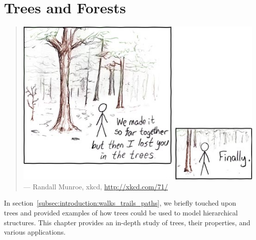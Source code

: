 
\chapter{Trees and Forests}
\label{chap:trees_forests}

\begin{quote}
\includegraphics[scale=3]{image/trees-forests/in-the-trees.png} \\
\noindent
--- Randall Munroe, xkcd,
\url{http://xkcd.com/71/}
\end{quote}

\noindent
In section~\ref{subsec:introduction:walks_trails_paths}, we briefly
touched upon trees and provided examples of how trees could be used to
model hierarchical structures. This chapter provides an in-depth study
of trees, their properties, and various applications.

{
}



